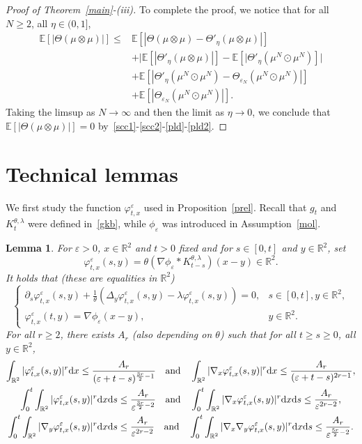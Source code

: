 \documentclass[11pt]{article}
\newtheorem{lemma}[theorem]{Lemma}
\newcommand{\E}{\mathbb{E}}
\newcommand{\R}{\mathbb{R}}
\newcommand{\1}{\mathbbm{1}}
\newcommand{\dd}{{\rm d}}
\newcommand{\e}{\varepsilon}
\newcommand{\vip}{\vskip5pt}
\begin{document}
\begin{proof}[Proof of Theorem~\ref{main}-(iii)]
\vip
To complete the proof, we notice that for all $N\geq2$, all $\eta \in(0,1]$,
\begin{align*}
\E[|\Theta(\mu\otimes\mu)|] \leq& \E[|\Theta(\mu\otimes\mu) -\Theta'_\eta(\mu\otimes\mu)|]\\  
&+\big|\E[|\Theta'_\eta(\mu\otimes\mu)|] - \E[|\Theta'_\eta(\mu^N\odot\mu^N)]\big|\\
&+\E[|\Theta'_\eta(\mu^N\odot\mu^N)-\Theta_{\e_N}(\mu^N\odot\mu^N)|]\\
&+\E[|\Theta_{\e_N}(\mu^N\odot\mu^N)|].
\end{align*}
Taking the limsup as $N\to \infty$ and then the limit as $\eta\to 0$, we conclude that $\E[|\Theta(\mu\otimes \mu)|]=0$ by~\eqref{scc1}-\eqref{scc2}-\eqref{pld}-\eqref{pld2}.
\end{proof}

\appendix

\section{Technical lemmas}\label{apa}



We first study the function $\varphi^\e_{t,x}$ used in Proposition~\ref{prel}.
Recall that $g_t$ and  $K^{\theta,\lambda}_t$ were defined in~\eqref{gkb}, while $\phi_\e$ was 
introduced in Assumption~\ref{mol}.

\begin{lemma}\label{tri} 
For $\e>0$, $x\in \R^2$ and $t>0$ fixed and for
$s\in [0,t]$ and $y\in \R^2$, set 
$$
\varphi^\e_{t,x}(s,y)=\theta(\nabla \phi_\e \ast K^{\theta,\lambda}_{t-s})(x-y)\in\R^2.
$$
It holds that (these are equalities in $\R^2$)
\begin{equation}\label{tri2}
\left\{\begin{array}{ll}
\partial_s \varphi^\e_{t,x}(s,y)+\frac1\theta(\Delta_y \varphi^\e_{t,x}(s,y) -\lambda 
\varphi^\e_{t,x}(s,y))=0, & s\in [0,t],y \in \R^2,\\[3pt]
\varphi^\e_{t,x}(t,y)=\nabla \phi_\e(x-y),&y \in \R^2.
\end{array}\right.
\end{equation}
For all $r\geq 2$, there exists $A_{r}$ (also depending on $\theta$)
such that for all $t\geq s \geq 0$, all $y\in \R^2$,
\begin{gather}
\int_{\R^2} |\varphi^\e_{t,x}(s,y)|^r \dd x \leq \frac{A_r}{(\e+t-s)^{\frac{3r}2-1}}
\quad \text{and} \quad 
\int_{\R^2} |\nabla_x\varphi^\e_{t,x}(s,y)|^r \dd x \leq \frac{A_r}{(\e+t-s)^{2r-1}},\label{estp0}\\
\int_0^t \int_{\R^2} |\varphi^\e_{t,x}(s,y)|^r \dd x \dd s \leq \frac{A_r}{\e^{\frac{3r}2-2}}
\quad \text{and} \quad 
\int_0^t \int_{\R^2} |\nabla_x\varphi^\e_{t,x}(s,y)|^r \dd x \dd s \leq \frac{A_r}{\e^{2r-2}},\label{estp1}\\
\int_0^t \int_{\R^2} |\nabla_y\varphi^\e_{t,x}(s,y)|^r \dd x \dd s \leq \frac{A_r}{\e^{2r-2}}
\quad \text{and} \quad 
\int_0^t \int_{\R^2} |\nabla_x\nabla_y\varphi^\e_{t,x}(s,y)|^r \dd x \dd s \leq \frac{A_r}{\e^{\frac{5r}2-2}}.
\label{estp2}
\end{gather}
\end{lemma}
\end{document}
